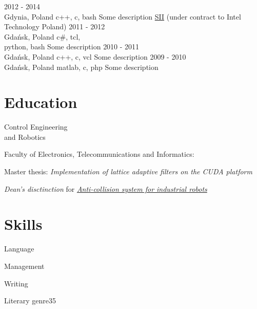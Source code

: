 \documentclass[a4paper,11pt]{cv4tw}%
\begin{document}
      {2012 - 2014\\Gdynia, Poland}
	  {c++, c, bash}
	  {Some description}
      {\href{https://sii.pl/en/}{SII} (under contract to Intel Technology Poland)}
      {2011 - 2012\\Gdańsk, Poland}
	  {c\#, tcl,\\python, bash}
	  {Some description}
      {2010 - 2011\\Gdańsk, Poland}
	  {c++, c, vcl}
	  {Some description}
      {2009 - 2010\\Gdańsk, Poland}
	  {matlab, c, php}
	  {Some description}
\section{Education}
      {Control Engineering\\and Robotics}
      {Faculty of Electronics, Telecommunications and Informatics:
        \begin{missions}
          \item Master thesis: \textit{Implementation of lattice adaptive filters on the CUDA platform}
          \item \emph{Dean's disctinction} for
            \href{https://projektgrupowy.eti.pg.gda.pl/editions/2/projects/496/posters/138}
                 {\itshape Anti-collision system for industrial robots}
        \end{missions}
      }
\section{Skills}
\begin{skills} {Language}
\end{skills}
\begin{skills}{Management}
\end{skills}
\begin{skills}{Writing}
\end{skills}
\begin{fields}{Literary genre}{3}{5}
\end{fields}

\end{document}
